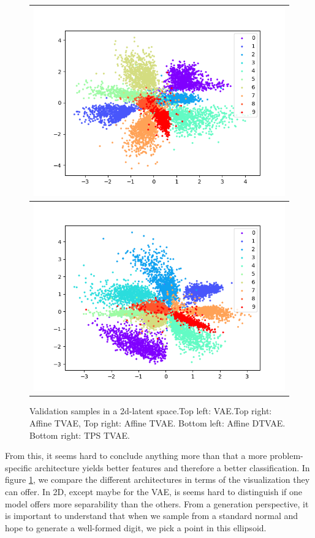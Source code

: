 \documentclass[letterpaper, twoside]{article}
\begin{document}
\begin{figure}[h]
\begin{minipage}{.5\textwidth}
\begin{tabular}{|@{}c@{}|}
        \includegraphics[scale=0.5]{dist_val_126.png}\\\hline
        \includegraphics[scale=0.5]{dist_val_138.png}\\ \hline
        \end{tabular}
        \end{minipage}%
        \caption{Validation samples in a 2d-latent space.Top left: VAE.Top right: Affine TVAE, Top right: Affine TVAE. Bottom left: Affine DTVAE. Bottom right: TPS TVAE.}
        \label{2dlatent}
      \end{figure}


      From this, it seems hard to conclude anything more than that a more problem-specific architecture yields better features and therefore a better classification. In figure \ref{2dlatent}, we compare the different architectures in terms of the visualization they can offer. In 2D, except maybe for the VAE, is seems hard to distinguish if one model offers more separability than the others. From a generation perspective, it is important to understand that when we sample from a standard normal and hope to generate a well-formed digit, we pick a point in this ellipsoid. \\
\end{document}
